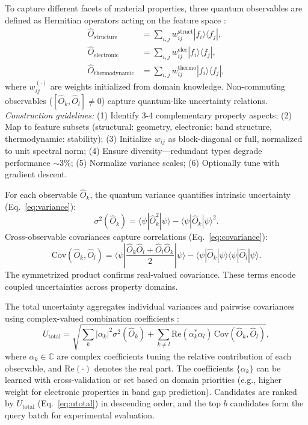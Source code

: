 \documentclass[conference]{IEEEtran}
\begin{document}
To capture different facets of material properties, three quantum observables are defined as Hermitian operators acting on the feature space \cite{mcardle2020quantum, bauer2023quantum}:
\begin{align}
\hat{O}_{\text{structure}} &= \sum_{i,j} w_{ij}^{\text{struct}} |f_i\rangle\langle f_j|, \\
\hat{O}_{\text{electronic}} &= \sum_{i,j} w_{ij}^{\text{elec}} |f_i\rangle\langle f_j|, \\
\hat{O}_{\text{thermodynamic}} &= \sum_{i,j} w_{ij}^{\text{thermo}} |f_i\rangle\langle f_j|,
\end{align}
where $w_{ij}^{(\cdot)}$ are weights initialized from domain knowledge. Non-commuting observables ($[\hat{O}_k, \hat{O}_l] \neq 0$) capture quantum-like uncertainty relations. \textit{Construction guidelines:} (1) Identify 3-4 complementary property aspects; (2) Map to feature subsets (structural: geometry, electronic: band structure, thermodynamic: stability); (3) Initialize $w_{ij}$ as block-diagonal or full, normalized to unit spectral norm; (4) Ensure diversity—redundant types degrade performance $\sim$3\%; (5) Normalize variance scales; (6) Optionally tune with gradient descent.

For each observable $\hat{O}_k$, the quantum variance quantifies intrinsic uncertainty (Eq.~\eqref{eq:variance}):
\begin{equation}
\sigma^2(\hat{O}_k) = \langle\psi|\hat{O}_k^2|\psi\rangle - \langle\psi|\hat{O}_k|\psi\rangle^2.\label{eq:variance}
\end{equation}
Cross-observable covariances capture correlations (Eq.~\eqref{eq:covariance}):
\begin{equation}
\text{Cov}(\hat{O}_k,\hat{O}_l) = \langle\psi|\frac{\hat{O}_k\hat{O}_l + \hat{O}_l\hat{O}_k}{2}|\psi\rangle - \langle\psi|\hat{O}_k|\psi\rangle\langle\psi|\hat{O}_l|\psi\rangle.\label{eq:covariance}
\end{equation}
The symmetrized product confirms real-valued covariance. These terms encode coupled uncertainties across property domains.

The total uncertainty aggregates individual variances and pairwise covariances using complex-valued combination coefficients \cite{gal2016dropout, lakshminarayanan2017simple}:
\begin{equation}
U_{\text{total}} = \sqrt{\sum_k |\alpha_k|^2 \sigma^2(\hat{O}_k) + \sum_{k \neq l} \text{Re}(\alpha_k^* \alpha_l) \,\text{Cov}(\hat{O}_k,\hat{O}_l)},\label{eq:utotal}
\end{equation}
where $\alpha_k \in \mathbb{C}$ are complex coefficients tuning the relative contribution of each observable, and $\text{Re}(\cdot)$ denotes the real part. The coefficients $\{\alpha_k\}$ can be learned with cross-validation or set based on domain priorities (e.g., higher weight for electronic properties in band gap prediction). Candidates are ranked by $U_{\text{total}}$ (Eq.~\eqref{eq:utotal}) in descending order, and the top $b$ candidates form the query batch for experimental evaluation.
\end{document}
